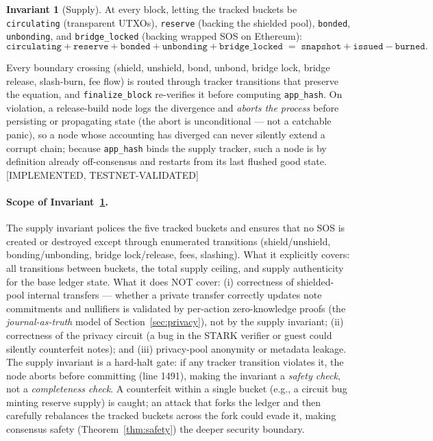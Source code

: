 \documentclass[11pt]{article}
\newcommand{\code}[1]{\texttt{#1}}
\newcommand{\statusV}{\textcolor{statgreen}{\textsf{\scriptsize[IMPLEMENTED, TESTNET-VALIDATED]}}}
\theoremstyle{plain}
\theoremstyle{definition}
\newtheorem{invariant}[theorem]{Invariant}
\theoremstyle{remark}
\begin{document}
\begin{invariant}[Supply]
\label{inv:supply}
At every block, letting the tracked buckets be \code{circulating} (transparent
UTXOs), \code{reserve} (backing the shielded pool), \code{bonded},
\code{unbonding}, and \code{bridge\_locked} (backing wrapped
SOS on Ethereum):
\[
\code{circulating} + \code{reserve} + \code{bonded} + \code{unbonding}
+ \code{bridge\_locked}
\;=\;
\code{snapshot} + \code{issued} - \code{burned}.
\]
\end{invariant}

Every boundary crossing (shield, unshield, bond, unbond, bridge lock,
bridge release, slash-burn, fee flow) is routed through tracker transitions
that preserve the equation, and \code{finalize\_block} re-verifies it before
computing \code{app\_hash}. On violation, a release-build node logs the
divergence and \emph{aborts the process} before persisting or propagating
state (the abort is unconditional --- not a catchable panic), so a node whose
accounting has diverged can never silently extend a corrupt chain; because
\code{app\_hash} binds the supply tracker, such a node is by definition
already off-consensus and restarts from its last flushed good state.
\statusV{}

\paragraph{Scope of Invariant~\ref{inv:supply}.} The supply invariant polices
the five tracked buckets and ensures that no SOS is created or destroyed except
through enumerated transitions (shield/unshield, bonding/unbonding,
bridge lock/release, fees, slashing). What it explicitly covers: all transitions
between buckets, the total supply ceiling, and supply authenticity for the base
ledger state. What it does NOT cover: (i) correctness of shielded-pool internal
transfers --- whether a private transfer correctly updates note commitments and
nullifiers is validated by per-action zero-knowledge proofs (the
\emph{journal-as-truth} model of Section~\ref{sec:privacy}), not by the supply
invariant; (ii) correctness of the privacy circuit (a bug in the STARK verifier
or guest could silently counterfeit notes); and (iii) privacy-pool anonymity or
metadata leakage. The supply invariant is a hard-halt gate: if any tracker
transition violates it, the node aborts before committing (line 1491), making
the invariant a \emph{safety check}, not a \emph{completeness check}. A
counterfeit within a single bucket (e.g., a circuit bug minting reserve supply)
is caught; an attack that forks the ledger and then carefully rebalances the
tracked buckets across the fork could evade it, making consensus safety
(Theorem~\ref{thm:safety}) the deeper security boundary.
\end{document}
